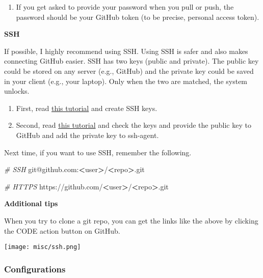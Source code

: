 \documentclass[
]{book}
\newenvironment{Shaded}{\begin{snugshade}}{\end{snugshade}}
\newcommand{\CommentTok}[1]{\textcolor[rgb]{0.56,0.35,0.01}{\textit{#1}}}
\newcommand{\ExtensionTok}[1]{#1}
\newcommand{\NormalTok}[1]{#1}
\newcommand{\OperatorTok}[1]{\textcolor[rgb]{0.81,0.36,0.00}{\textbf{#1}}}
\providecommand{\tightlist}{%
  \setlength{\itemsep}{0pt}\setlength{\parskip}{0pt}}
\begin{document}
\begin{enumerate}
\def\labelenumi{\arabic{enumi}.}
\setcounter{enumi}{2}
\tightlist
\item
  If you get asked to provide your password when you pull or push, the password should be your GitHub token (to be precise, personal access token).
\end{enumerate}

\textbf{SSH}

If possible, I highly recommend using SSH. Using SSH is safer and also makes connecting GitHub easier. SSH has two keys (public and private). The public key could be stored on any server (e.g., GitHub) and the private key could be saved in your client (e.g., your laptop). Only when the two are matched, the system unlocks.

\begin{enumerate}
\def\labelenumi{\arabic{enumi}.}
\item
  First, read \href{https://docs.github.com/en/github/authenticating-to-github/connecting-to-github-with-ssh}{this tutorial} and create SSH keys.
\item
  Second, read \href{https://happygitwithr.com/ssh-keys.html}{this tutorial} and check the keys and provide the public key to GitHub and add the private key to ssh-agent.
\end{enumerate}

Next time, if you want to use SSH, remember the following.

\begin{Shaded}
\begin{Highlighting}[]
\CommentTok{\# SSH}
\ExtensionTok{git@github.com:}\OperatorTok{\textless{}}\NormalTok{user}\OperatorTok{\textgreater{}}\NormalTok{/}\OperatorTok{\textless{}}\NormalTok{repo}\OperatorTok{\textgreater{}}\NormalTok{.git}

\CommentTok{\# HTTPS}
\ExtensionTok{https://github.com/}\OperatorTok{\textless{}}\NormalTok{user}\OperatorTok{\textgreater{}}\NormalTok{/}\OperatorTok{\textless{}}\NormalTok{repo}\OperatorTok{\textgreater{}}\NormalTok{.git}
\end{Highlighting}
\end{Shaded}

\textbf{Additional tips}

When you try to clone a git repo, you can get the links like the above by clicking the CODE action button on GitHub.

\texttt{[image: misc/ssh.png]}

\hypertarget{configurations}{%
\subsubsection{Configurations}\label{configurations}}
\end{document}
